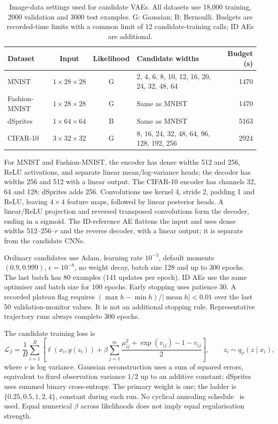 \documentclass[make,article,submit,pdftex,moreauthors]{Definitions/mdpi}
\begin{document}
\begin{table}[H]
\caption{Image-data settings used for candidate VAEs. All datasets use
18,000 training, 2000 validation and 3000 test examples. G: Gaussian;
B: Bernoulli. Budgets are recorded-time limits with a common limit of
12 candidate-training calls; ID AEs are additional.}
\label{tab:data}\small
\begin{tabularx}{\textwidth}{lccXr}\toprule
Dataset & Input & Likelihood & Candidate widths & Budget (s) \\\midrule
MNIST & $1\times28\times28$ & G & 2, 4, 6, 8, 10, 12, 16, 20, 24, 32, 48, 64 & 1470 \\
Fashion-MNIST & $1\times28\times28$ & G & Same as MNIST & 1470 \\
dSprites & $1\times64\times64$ & B & Same as MNIST & 5163 \\
CIFAR-10 & $3\times32\times32$ & G & 8, 16, 24, 32, 48, 64, 96, 128, 192, 256 & 2924 \\
\bottomrule\end{tabularx}
\end{table}

For MNIST and Fashion-MNIST, the encoder has dense widths 512 and 256,
ReLU activations, and separate linear mean/log-variance heads; the decoder
has widths 256 and 512 with a linear output. The CIFAR-10 encoder has
channels 32, 64 and 128; dSprites adds 256. Convolutions use kernel 4,
stride 2, padding 1 and ReLU, leaving $4\times4$ feature maps, followed
by linear posterior heads. A linear/ReLU projection and reversed
transposed convolutions form the decoder, ending in a sigmoid. The
ID-reference AE flattens the input and uses dense widths 512--256--$r$
and the reverse decoder, with a linear output; it is separate from the
candidate CNNs.

Ordinary candidates use Adam, learning rate $10^{-3}$, default moments
$(0.9,0.999)$, $\epsilon=10^{-8}$, no weight decay, batch size 128 and
up to 300 epochs. The last batch has 80 examples (141 updates per epoch).
ID AEs use the same optimiser and batch size for 100 epochs.
Early stopping uses patience 30. A recorded plateau flag requires
$(\max h-\min h)/|\operatorname{mean}h|<0.01$ over the last 50
validation-monitor values. It is not an additional stopping rule.
Representative trajectory runs always complete 300 epochs.

The candidate training loss is
\begin{equation}
 \mathcal L_\beta=\frac1B\sum_{i=1}^B
 \left[\ell(x_i,g(z_i))+\beta\sum_{j=1}^{m}
 \frac{\mu_{ij}^2+\exp(v_{ij})-1-v_{ij}}{2}\right],
 \qquad z_i\sim q_\phi(z\mid x_i),
 \label{eq:loss}
\end{equation}
where $v$ is log variance. Gaussian reconstruction uses a sum of squared
errors, equivalent to fixed observation variance $1/2$ up to an additive
constant; dSprites uses summed binary cross-entropy. The primary weight
is one; the ladder is $\{0.25,0.5,1,2,4\}$, constant during each run.
No cyclical annealing schedule~\cite{fu2019cyclical} is used.
Equal numerical $\beta$ across likelihoods does not imply equal
regularisation strength.
\end{document}

